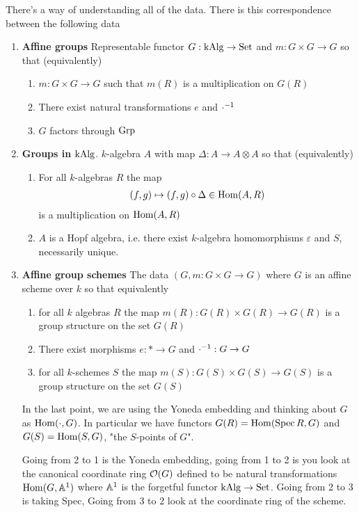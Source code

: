 \documentclass[12pt]{article}
\begin{document}
There's a way of understanding all of the data. There is this correspondence between the following data \begin{enumerate}
    \item \textbf{Affine groups} Representable functor $G:\operatorname{kAlg}\to\operatorname{Set}$ and $m:G\times G\to G$ so that (equivalently) \begin{enumerate}
        \item $m:G\times G\to G$ such that $m(R)$ is a multiplication on $G(R)$
        \item There exist natural transformations $e$ and ${\cdot}^{-1}$
        \item $G$ factors through $\operatorname{Grp}$
    \end{enumerate}
    \item \textbf{Groups in} $\operatorname{kAlg}$.  $k$-algebra $A$ with map $\Delta:A\to A\otimes A$ so that (equivalently) \begin{enumerate}
        \item For all $k$-algebras $R$ the map \begin{align*}
            (f,g)\mapsto (f,g)\circ \Delta\in \operatorname{Hom}(A,R)
        \end{align*} is a multiplication on $\operatorname{Hom}(A,R)$
        \item $A$ is a Hopf algebra, i.e. there exist $k$-algebra homomorphisms $\varepsilon$ and $S$, necessarily unique.
    \end{enumerate}
    \item \textbf{Affine group schemes} The data $(G,m:G\times G\to G)$ where $G$ is an affine scheme over $k$ so that equivalently \begin{enumerate}
        \item for all $k$ algebras $R$ the map $m(R):G(R)\times G(R)\to G(R)$ is a group structure on the set $G(R)$
        \item There exist morphisms $e:*\to G$ and ${\cdot}^{-1}:G\to G$
        \item for all $k$-schemes $S$ the map $m(S):G(S)\times G(S)\to G(S)$ is a group structure on the set $G(S)$
    \end{enumerate}
    In the last point, we are using the Yoneda embedding and thinking about $G$ as $\operatorname{Hom}(\cdot,G)$. In particular we have functors $G(R) = \operatorname{Hom}(\operatorname{Spec} R,G)$ and $G(S) = \operatorname{Hom}(S,G)$, "the $S$-points of $G$".

    \hfill

    Going from 2 to 1 is the Yoneda embedding, going from 1 to 2 is you look at the canonical coordinate ring $\mathcal{O}(G)$ defined to be natural transformations $\operatorname{Hom}(G,\mathbb{A}^1)$ where $\mathbb{A}^1$ is the forgetful functor $\operatorname{kAlg}\to\operatorname{Set}$. Going from 2 to 3 is taking Spec, Going from 3 to 2 look at the coordinate ring of the scheme.
\end{enumerate}
\end{document}
